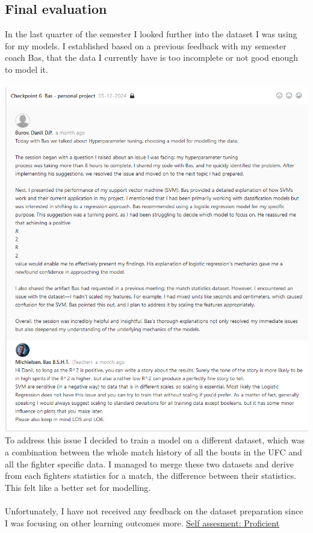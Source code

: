 \documentclass{article}
\begin{document}
	\subsection{Final evaluation}
	In the last quarter of the semester I looked further into the dataset I was using for my models. I established based on a previous feedback with my semester coach Bas, that the data I currently have is too incomplete or not good enough to model it.\\\\
	\includegraphics[width=\textwidth]{images/Feedback_Bas_2.png}\\
	To address this issue I decided to train a model on a different dataset, which was a combination between the whole match history of all the bouts in the UFC and all the fighter specific data. I managed to merge these two datasets and derive from each fighters statistics for a match, the difference between their statistics. This felt like a better set for modelling.\\\\
	Unfortunately, I have not received any feedback on the dataset preparation since I was focusing on other learning outcomes more.
	\underline{Self assesment: Proficient}
	
\end{document}

